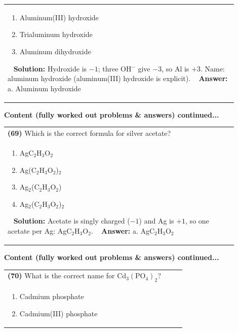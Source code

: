 \documentclass{article}
\begin{document}
{\begin{tabular}{|p{0.9\linewidth}|}
\begin{minipage}[t]{0.85\linewidth}
\begin{enumerate}[label=\alph*.]
\item Aluminum(III) hydroxide \
\item Trialuminum hydroxide \
\item Aluminum dihydroxide
\end{enumerate}
\end{minipage}\
\hline
\vspace{0.2cm}
\textbf{Solution:} Hydroxide is $-1$; three OH$^-$ give $-3$, so Al is $+3$. Name: aluminum hydroxide (aluminum(III) hydroxide is explicit). \
\hline
\vspace{0.2cm}
\textbf{Answer:} a. Aluminum hydroxide \
\hline
\end{tabular}
\newpage
\noindent
{\large\textbf{Content (fully worked out problems & answers) continued...}}\\[0.2em]
\begin{tabular}{|p{0.9\linewidth}|}
\hline
\vspace{0.2cm}
\textbf{(69)} Which is the correct formula for silver acetate? \\
\begin{minipage}[t]{0.85\linewidth}
\begin{enumerate}[label=\alph*.]
\item AgC$_2$H$_3$O$_2$ \
\item Ag(C$_2$H$_3$O$_2$)$_2$ \
\item Ag$_2$(C$_2$H$_3$O$_2$) \
\item Ag$_2$(C$_2$H$_3$O$_2$)$_2$
\end{enumerate}
\end{minipage}\
\hline
\vspace{0.2cm}
\textbf{Solution:} Acetate is singly charged ($-1$) and Ag is $+1$, so one acetate per Ag: AgC$_2$H$_3$O$_2$. \
\hline
\vspace{0.2cm}
\textbf{Answer:} a. AgC$_2$H$_3$O$_2$ \
\hline
\end{tabular}
\newpage
\noindent
{\large\textbf{Content (fully worked out problems & answers) continued...}}\\[0.2em]
\begin{tabular}{|p{0.9\linewidth}|}
\hline
\vspace{0.2cm}
\textbf{(70)} What is the correct name for $\text{Cd}_3(\text{PO}_4)_2$? \\
\begin{minipage}[t]{0.85\linewidth}
\begin{enumerate}[label=\alph*.]
\item Cadmium phosphate \
\item Cadmium(III) phosphate \

\end{enumerate}
\end{minipage}
\end{tabular}}
\end{document}
